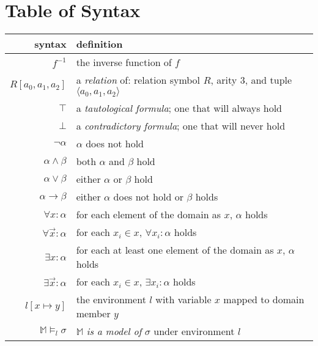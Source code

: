 \section{Table of Syntax}
	\begin{tabular}{|r|l|}
		\hline
		\textbf{syntax}                  &  \textbf{definition}                                                     \\
		\hline
		$f^{-1}$                         &  the inverse function of $f$                                             \\
		\hline
		$R[a_0,a_1,a_2]$                 &  a \emph{relation} of: relation symbol $R$, arity $3$, and tuple $\langle a_0,a_1,a_2 \rangle$  \\
		$\top$                           &  a \emph{tautological formula}; one that will always hold                \\
		$\bot$                           &  a \emph{contradictory formula}; one that will never hold                \\
		$\neg \alpha$                    &  $\alpha$ does not hold                                                  \\
		$\alpha \wedge \beta$            &  both $\alpha$ and $\beta$ hold                                          \\
		$\alpha \vee \beta$              &  either $\alpha$ or $\beta$ hold                                         \\
		$\alpha \to \beta$               &  either $\alpha$ does not hold or $\beta$ holds                          \\
		$\forall x : \alpha$             &  for each element of the domain as $x$, $\alpha$ holds                   \\
		$\forall \vec{x} : \alpha$       &  for each $x_i \in x$, $\forall x_i : \alpha$ holds                      \\
		$\exists x : \alpha$             &  for each at least one element of the domain as $x$, $\alpha$ holds      \\
		$\exists \vec{x} : \alpha$       &  for each $x_i \in x$, $\exists x_i : \alpha$ holds                      \\
		\hline
		$l[x \mapsto y]$                 &  the environment $l$ with variable $x$ mapped to domain member $y$       \\
		\hline
		$\mathbb{M} \models_l \sigma$    &  $\mathbb{M}$ \emph{is a model of} $\sigma$ under environment $l$        \\

\end{tabular}
